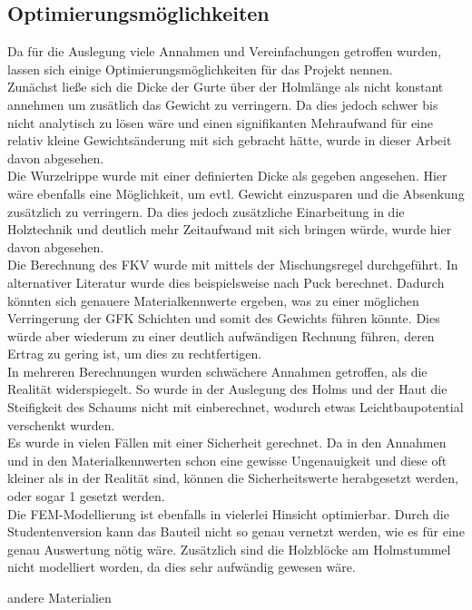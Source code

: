 \subsection{Optimierungsmöglichkeiten}
Da für die Auslegung viele Annahmen und Vereinfachungen getroffen wurden, lassen sich einige Optimierungsmöglichkeiten für das Projekt nennen.\\
\noindent
Zunächst ließe sich die Dicke der Gurte über der Holmlänge als nicht konstant annehmen um zusätlich das Gewicht zu verringern. Da dies jedoch schwer bis nicht analytisch zu lösen wäre und einen signifikanten Mehraufwand für eine relativ kleine Gewichtsänderung mit sich gebracht hätte, wurde in dieser Arbeit davon abgesehen.\\
\noindent
Die Wurzelrippe wurde mit einer definierten Dicke als gegeben angesehen. Hier wäre ebenfalls eine Möglichkeit, um evtl. Gewicht einzusparen und die Absenkung zusätzlich zu verringern. Da dies jedoch zusätzliche Einarbeitung in die Holztechnik und deutlich mehr Zeitaufwand mit sich bringen würde, wurde hier davon abgesehen.\\
\noindent
Die Berechnung des FKV wurde mit mittels der Mischungsregel durchgeführt. In alternativer Literatur wurde dies beispielsweise nach Puck berechnet. Dadurch könnten sich genauere Materialkennwerte ergeben, was zu einer möglichen Verringerung der GFK Schichten und somit des Gewichts führen könnte. Dies würde aber wiederum zu einer deutlich aufwändigen Rechnung führen, deren Ertrag zu gering ist, um dies zu rechtfertigen.\\
\noindent
In mehreren Berechnungen wurden schwächere Annahmen getroffen, als die Realität widerspiegelt. So wurde in der Auslegung des Holms und der Haut die Steifigkeit des Schaums nicht mit einberechnet, wodurch etwas Leichtbaupotential verschenkt wurden.\\
\noindent
Es wurde in vielen Fällen mit einer Sicherheit gerechnet. Da in den Annahmen und in den Materialkennwerten schon eine gewisse Ungenauigkeit und diese oft kleiner als in der Realität sind, können die Sicherheitswerte herabgesetzt werden, oder sogar 1 gesetzt werden.\\
\noindent
Die FEM-Modellierung ist ebenfalls in vielerlei Hinsicht optimierbar. Durch die Studentenversion kann das Bauteil nicht so genau vernetzt werden, wie es für eine genau Auswertung nötig wäre. Zusätzlich sind die Holzblöcke am Holmstummel nicht modelliert worden, da dies sehr aufwändig gewesen wäre.\\
\noindent

andere Materialien 
